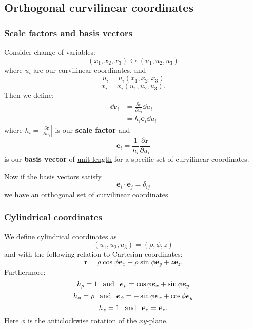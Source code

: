 \documentclass{article}
\begin{document}
\subsection{Orthogonal curvilinear coordinates}

\subsubsection{Scale factors and basis vectors}
Consider change of variables:
$$(x_1,x_2,x_3)\leftrightarrow(u_1,u_2,u_3)$$
where $u_i$ are our curvilinear coordinates, and
$$u_i=u_i(x_1,x_2,x_3)$$
$$x_i=x_i(u_1,u_2,u_3).$$
Then we define:
\begin{align*}
    \dd\boldsymbol{r}_i
    &=\frac{\partial\boldsymbol{r}}{\partial u_i}\dd u_i \\
    &=h_i\boldsymbol{e}_i \dd u_i
\end{align*}
where $h_i=|\displaystyle\frac{\partial\boldsymbol{r}}{\partial u_i}|$ is our \textbf{scale factor} and 
$$\boldsymbol{e}_i=\frac{1}{h_i}\frac{\partial\boldsymbol{r}}{\partial u_i}$$
is our \textbf{basis vector} of \underline{unit length} for a specific set of curvilinear coordinates.

Now if the basis vectors satisfy
$$\boldsymbol{e}_i\cdot\boldsymbol{e}_j=\delta_{ij}$$
we have an \underline{orthogonal} set of curvilinear coordinates.

\subsubsection{Cylindrical coordinates}
We define cylindrical coordinates as
$$(u_1,u_2,u_3)=(\rho,\phi,z)$$
and with the following relation to Cartesian coordinates:
$$\boldsymbol{r}=\rho\cos\phi\boldsymbol{e}_x
+\rho\sin\phi\boldsymbol{e}_y+z\boldsymbol{e}_z.$$
Furthermore:
$$h_{\rho}=1\hspace{0.1in}\text{and}\hspace{0.1in}\boldsymbol{e}_{\rho}=\cos\phi\boldsymbol{e}_{x}
+\sin\phi\boldsymbol{e}_{y}$$
$$h_{\phi}=\rho\hspace{0.1in}\text{and}\hspace{0.1in}
\boldsymbol{e}_{\phi}=-\sin\phi\boldsymbol{e}_x+\cos\phi\boldsymbol{e}_y$$
$$h_{z}=1\hspace{0.1in}\text{and}\hspace{0.1in}\boldsymbol{e}_z=\boldsymbol{e}_z.$$
Here $\phi$ is the \underline{anticlockwise} rotation of the $xy$-plane.

\newpage
\end{document}

